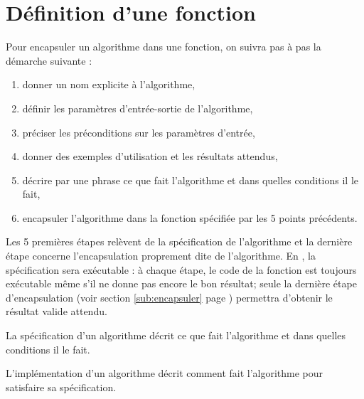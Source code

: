 \section{Définition d'une fonction}\label{definition}
\noindent Pour encapsuler un algorithme dans une fonction, on suivra pas à pas 
la démarche suivante :
\begin{enumerate}
\item donner un nom explicite à l'algorithme,
\item définir les paramètres d'entrée-sortie de l'algorithme,
\item préciser les préconditions sur les paramètres d'entrée,
\item donner des exemples d'utilisation et les résultats attendus,
\item décrire par une phrase ce que fait l'algorithme et dans quelles conditions il le fait,
\item encapsuler l'algorithme dans la fonction spécifiée par les 5 points
	précédents.
\end{enumerate}
Les 5 premières étapes relèvent de la spécification de l'algorithme et la
dernière étape concerne l'encapsulation proprement dite de l'algorithme.
En \python, la spécification sera exécutable : à chaque étape, le code de la fonction 
est toujours exécutable même s'il ne donne pas encore le bon résultat; seule la dernière 
étape d'encapsulation (voir section \ref{sub:encapsuler} page \pageref{sub:encapsuler})
permettra d'obtenir le résultat valide attendu.

\begin{defin}
La spécification d'un algorithme décrit ce que fait l'algorithme 
et dans quelles conditions il le fait.
\end{defin}

\begin{defin}
L'implémentation d'un algorithme décrit comment fait l'algorithme 
pour satisfaire sa spécification.
\end{defin}

